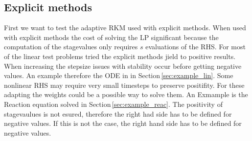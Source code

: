 \documentclass[a4paper]{scrartcl}
\numberwithin{equation}{section}
\theoremstyle{plain}
\theoremstyle{definition}
\numberwithin{theorem}{section}
\newcommand{\1}{\mathbbm{1}}
\begin{document}
\subsection{Explicit methods}
First we want to test the adaptive RKM used with explicit methods. 
When used with explicit methods the cost of solving the LP significant because the computation of the stagevalues only requires $s$ evaluations of the RHS.
For most of the linear test problems tried the explicit methods jield to positive results. 
When increasing the stepsize issues with stability occur before getting negative values. 
An example therefore the ODE in in Section\,\ref{sec:example_lin}.
Some nonlinear RHS may require very small timesteps to preserve positifity. 
For these adapting the weights could be a possible way to solve them.
An Exmample is the Reaction equation solved in Section\,\ref{sec:example_reac}.
The positivity of stagevaulues is not esured, therefore the right had side has to be defined for negative values. If this is not the case, the right hand side has to be defined for negative values.
\end{document}
